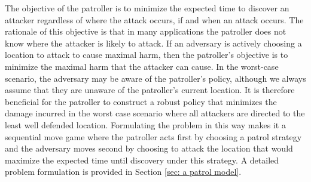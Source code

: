 \documentclass[11pt,a4paper]{article}
\newcommand{\new}[1]{{\color{black}#1}}
\begin{document}
The objective of the patroller is to minimize the expected time to discover an attacker regardless of where the attack occurs, if and when an attack occurs.
The rationale of this objective is that in many applications the patroller does not know where the attacker is likely to attack.
If an adversary is actively choosing a location to attack to cause maximal harm, then the patroller's objective is to minimize the maximal harm that the attacker can cause.
In the worst-case scenario, the adversary may be aware of the patroller's policy, although we always assume that they are unaware of the patroller's current location.
It is therefore beneficial for the patroller to construct a robust policy that minimizes the damage incurred in the worst case scenario where all attackers are directed to the least well defended location.
Formulating the problem in this way makes it a sequential move game where the patroller acts first by choosing a patrol strategy and the adversary moves second by choosing to attack the location that would maximize the expected time until discovery under this strategy.
A detailed problem formulation is provided in Section \ref{sec: a patrol model}.
\end{document}
